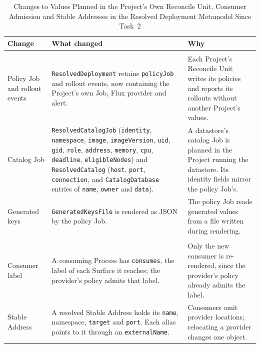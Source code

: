 \begin{table}[!htbp]
\centering
\footnotesize
\begin{tabular}{>{\raggedright\arraybackslash}p{}>{\raggedright\arraybackslash}p{}>{\raggedright\arraybackslash}p{}}
\hline
\textbf{Change} & \textbf{What changed} & \textbf{Why} \\
\hline
\multicolumn{3}{l}{\textit{Values planned in the Project's own Reconcile Unit}} \\
Policy Job and rollout events & \texttt{ResolvedDeployment} retains \texttt{policyJob} and rollout events, now containing the Project's own Job, Flux provider and alert. & Each Project's Reconcile Unit writes its policies and reports its rollouts without another Project's values. \\
Catalog Job & \texttt{ResolvedCatalogJob} (\texttt{identity}, \texttt{namespace}, \texttt{image}, \texttt{imageVersion}, \texttt{uid}, \texttt{gid}, \texttt{role}, \texttt{address}, \texttt{memory}, \texttt{cpu}, \texttt{deadline}, \texttt{eligibleNodes}) and \texttt{ResolvedCatalog} (\texttt{host}, \texttt{port}, \texttt{connection}, and \texttt{CatalogDatabase} entries of \texttt{name}, \texttt{owner} and \texttt{data}). & A datastore's catalog Job is planned in the Project running the datastore. Its identity fields mirror the policy Job's. \\
Generated keys & \texttt{GeneratedKeysFile} is rendered as JSON by the policy Job. & The policy Job reads generated values from a file written during rendering. \\
\multicolumn{3}{l}{\textit{Consumer admission and Stable Addresses}} \\
Consumer label & A consuming Process has \texttt{consumes}, the label of each Surface it reaches; the provider's policy admits that label. & Only the new consumer is re-rendered, since the provider's policy already admits the label. \\
Stable Address & A resolved Stable Address holds its \texttt{name}, namespace, \texttt{target} and \texttt{port}. Each alias points to it through an \texttt{externalName}. & Consumers omit provider locations; relocating a provider changes one object. \\
\hline
\end{tabular}
\caption{Changes to Values Planned in the Project's Own Reconcile Unit, Consumer Admission and Stable Addresses in the Resolved Deployment Metamodel Since Task~2}
\label{tab:app-target}
\end{table}

